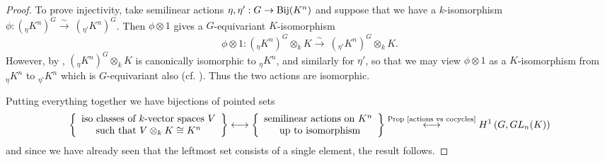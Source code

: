 \documentclass[11pt]{amsart}
\numberwithin{equation}{section}
\theoremstyle{remark}
\theoremstyle{remark}
\theoremstyle{remark}
\theoremstyle{definition}
\theoremstyle{definition}
\theoremstyle{definition}
\theoremstyle{definition}
\theoremstyle{definition}
\theoremstyle{definition}
\begin{document}
\begin{proof}
To prove injectivity, take semilinear actions $\eta,\eta':G\rightarrow \textup{Bij}(K^n)$ and suppose that we have a $k$-isomorphism $\phi:(_\eta K^n)^G \stackrel{\sim}{\longrightarrow} ~(_{\eta'} K^n)^G$. Then $\phi\otimes 1$ gives a $G$-equivariant $K$-isomorphism
\[\phi\otimes 1: (_\eta K^n)^G\otimes_k K \stackrel{\sim}{\longrightarrow} ~(_{\eta'} K^n)^G\otimes_k K.\]
However, by , $(_\eta K^n)^G\otimes_k K$ is canonically isomorphic to $_\eta K^n$, and similarly for $\eta'$, so that we may view $\phi \otimes 1$ as a $K$-isomorphism from $_\eta K^n$ to $_{\eta'} K^n$ which is $G$-equivariant also (cf. ).  Thus the two actions are isomorphic. 

Putting everything together we have bijections of pointed sets
\[\left\{\begin{array}{c}\textup{iso classes of }k\textup{-vector spaces }V\\ \textup{such that }V\otimes_k K \cong K^n\end{array}\right\} \longleftrightarrow  \left\{\begin{array}{c}\textup{semilinear actions on }K^n\\\textup{ up to isomorphism}\end{array}\right\}\stackrel{\textup{Prop \ref{actions vs cocycles}}}{\longleftrightarrow} H^1\left(G,GL_n(K)\right)\]
and since we have already seen that the leftmost set consists of a single element, the result follows.
\end{proof}
\end{document}
